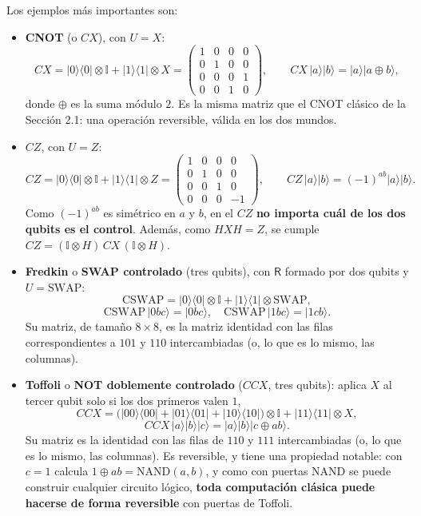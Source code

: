 \documentclass[11pt, a4paper, twoside, openright]{report}
\begin{document}
\noindent Los ejemplos más importantes son:
\begin{itemize}
    \item \textbf{CNOT} (o $CX$), con $U = X$:
    \[ CX = |0\rangle\langle0|\otimes\mathbb{I} + |1\rangle\langle1|\otimes X = \begin{pmatrix} 1&0&0&0\\0&1&0&0\\0&0&0&1\\0&0&1&0\end{pmatrix}, \qquad CX\,|a\rangle|b\rangle = |a\rangle|a\oplus b\rangle, \]
    donde $\oplus$ es la suma módulo $2$. Es la misma matriz que el CNOT clásico de la Sección 2.1: una operación reversible, válida en los dos mundos.
    \item \textbf{$CZ$}, con $U = Z$:
    \[ CZ = |0\rangle\langle0|\otimes\mathbb{I} + |1\rangle\langle1|\otimes Z = \begin{pmatrix} 1&0&0&0\\0&1&0&0\\0&0&1&0\\0&0&0&-1\end{pmatrix}, \qquad CZ\,|a\rangle|b\rangle = (-1)^{ab}|a\rangle|b\rangle. \]
    Como $(-1)^{ab}$ es simétrico en $a$ y $b$, en el $CZ$ \textbf{no importa cuál de los dos qubits es el control}. Además, como $HXH = Z$, se cumple $CZ = (\mathbb{I}\otimes H)\,CX\,(\mathbb{I}\otimes H)$.
    \item \textbf{Fredkin} o \textbf{SWAP controlado} (tres qubits), con $\mathsf{R}$ formado por dos qubits y $U = \mathrm{SWAP}$:
    \[ \mathrm{CSWAP} = |0\rangle\langle0|\otimes\mathbb{I} + |1\rangle\langle1|\otimes\mathrm{SWAP}, \]
    \[ \mathrm{CSWAP}\,|0bc\rangle = |0bc\rangle, \quad \mathrm{CSWAP}\,|1bc\rangle = |1cb\rangle. \]
    Su matriz, de tamaño $8\times8$, es la matriz identidad con las filas correspondientes a $101$ y $110$ intercambiadas (o, lo que es lo mismo, las columnas).
    \item \textbf{Toffoli} o \textbf{NOT doblemente controlado} ($CCX$, tres qubits): aplica $X$ al tercer qubit solo si los dos primeros valen $1$,
    \[ CCX = \big(|00\rangle\langle00| + |01\rangle\langle01| + |10\rangle\langle10|\big)\otimes\mathbb{I} + |11\rangle\langle11|\otimes X, \]
    \[ CCX\,|a\rangle|b\rangle|c\rangle = |a\rangle|b\rangle|c\oplus ab\rangle. \]
    Su matriz es la identidad con las filas de $110$ y $111$ intercambiadas (o, lo que es lo mismo, las columnas). Es reversible, y tiene una propiedad notable: con $c = 1$ calcula $1\oplus ab = \mathrm{NAND}(a,b)$, y como con puertas NAND se puede construir cualquier circuito lógico, \textbf{toda computación clásica puede hacerse de forma reversible} con puertas de Toffoli.
\end{itemize}
\end{document}
